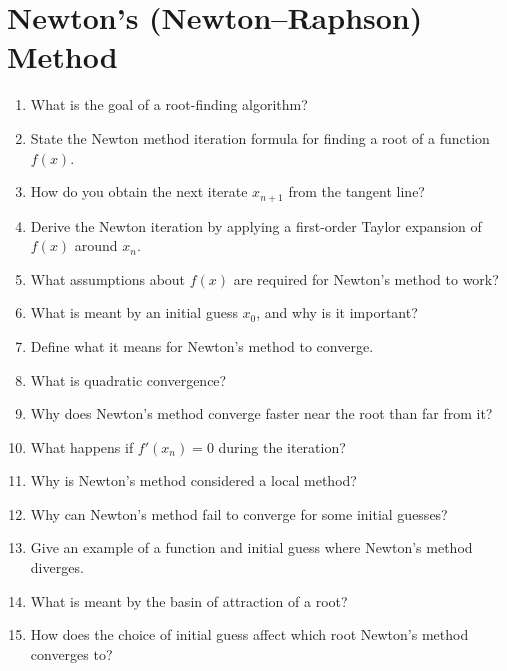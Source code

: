 \section{Newton's (Newton--Raphson) Method}

\begin{enumerate}

\item What is the goal of a root-finding algorithm?

\item State the Newton method iteration formula for finding a root of a function $f(x)$.

\item How do you obtain the next iterate $x_{n+1}$ from the tangent line?

\item Derive the Newton iteration by applying a first-order Taylor expansion of $f(x)$ around $x_n$.

\item What assumptions about $f(x)$ are required for Newton's method to work?

\item What is meant by an initial guess $x_0$, and why is it important?

\item Define what it means for Newton's method to converge.

\item What is quadratic convergence?

\item Why does Newton's method converge faster near the root than far from it?

\item What happens if $f'(x_n) = 0$ during the iteration?

\item Why is Newton's method considered a local method?

\item Why can Newton's method fail to converge for some initial guesses?

\item Give an example of a function and initial guess where Newton's method diverges.

\item What is meant by the basin of attraction of a root?

\item How does the choice of initial guess affect which root Newton's method converges to?


\end{enumerate}

